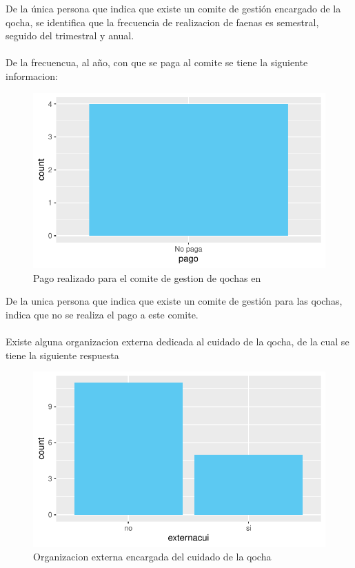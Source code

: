 \documentclass[12pt]{article}\usepackage[]{graphicx}\usepackage[]{xcolor}
\makeatletter
\def\maxwidth{ %
  \ifdim\Gin@nat@width>\linewidth
    \linewidth
  \else
    \Gin@nat@width
  \fi
}
\newenvironment{knitrout}{}{} %
\makeatother
\begin{document}
	De la única persona que indica que existe un comite de gestión encargado de la qocha, se identifica que la frecuencia de realizacion de faenas es semestral, seguido del trimestral y anual.\\
	\\
	De la frecuencua, al año, con que se paga al comite se tiene la siguiente informacion:
	\begin{figure}[H]
	\centering
\begin{knitrout}
\color{fgcolor}
\includegraphics[width=\maxwidth]{figure/veinticinco-1} 
\end{knitrout}
	\caption{Pago realizado para el comite de gestion de qochas en \comunidad}
	\end{figure}
	De la unica persona que indica que existe un comite de gestión para las qochas, indica que no se realiza el pago a este comite.\\
	\\
	Existe alguna organizacion externa dedicada al cuidado de la qocha, de la cual se tiene la siguiente respuesta
	\begin{figure}[H]
	\centering
\begin{knitrout}
\color{fgcolor}
\includegraphics[width=\maxwidth]{figure/veintiseis-1} 
\end{knitrout}
	\caption{Organizacion externa encargada del cuidado de la qocha}
	\end{figure}
\end{document}

